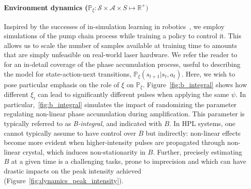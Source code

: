 \paragraph{Environment dynamics ($\mathbb P_\xi: \mathcal S \times \mathcal A \times S \mapsto \mathbb{R}^+)$}
Inspired by the successes of in-simulation learning in robotics~\citep{antonova2017reinforcement, akkaya2019solving, tiboni2023domain}, we employ simulations of the pump chain process while training a policy to control it. This allows us to scale the number of samples available at training time to amounts that are simply unfeasible on real-world laser hardware.
We refer the reader to~\cite{paschotta2008field} for an in-detail coverage of the phase accumulation process, useful to describing the model for state-action-next transitions, $\mathbb P_\xi (s_{t+1}\vert s_t, a_t)$. Here, we wish to pose particular emphasis on the role of $\xi$ on $\mathbb P_\xi$. Figure~\ref{fig:b_integral} shows how different $\xi_i$ can lead to significantly different pulses when applying the same $\psi$. In particular,~\ref{fig:b_integral} simulates the impact of randomizing the parameter regulating non-linear phase accumulation during amplification. This parameter is typically referred to as \emph{B-integral}, and indicated with $B$. 
In HPL systems, one cannot typically assume to have control over $B$ but indirectly: non-linear effects become more evident when higher-intensity pulses are propagated through non-linear crystal, which induces non-stationarity in $B$. Further, precisely estimating $B$ at a given time is a challenging tasks, prone to imprecision and which can have drastic impacts on the peak intensity achieved (Figure~\ref{fig:dynamics_peak_intensity}).

    
